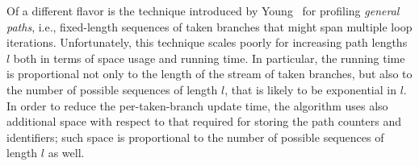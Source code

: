 Of a different flavor is the technique introduced by Young~\cite{Young98} for profiling {\em general paths}, i.e., fixed-length sequences of taken branches that might span multiple loop iterations.
Unfortunately, this technique scales poorly for increasing path lengths $l$ both in terms of space usage and running time. In particular, the running time is proportional not only to the length of the stream of taken branches, but also to the number of possible sequences of length $l$, that is likely to be exponential in $l$. In order to reduce the per-taken-branch update time, the algorithm uses also additional space with respect to that required for storing the path counters and identifiers; such space is proportional to the number of possible sequences of length $l$ as well.